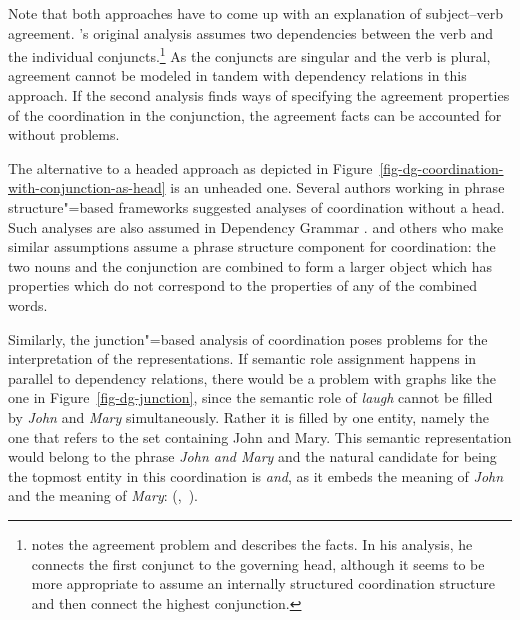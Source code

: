 Note that both approaches have to come up with an explanation of subject--verb agreement. \tes's
original analysis assumes two dependencies between the verb and the individual conjuncts.\footnote{%
  \citet[]{Eroms2000a} notes the agreement problem and describes the facts. In his
  analysis, he connects the first conjunct to the governing head, although it seems to be more
  appropriate to assume an internally structured coordination structure and then connect the highest conjunction.
} As the conjuncts are singular and the verb is plural, agreement cannot be modeled in tandem with dependency
relations in this approach. 
If the second analysis finds ways of specifying the agreement properties
of the coordination in the conjunction, the agreement facts can be accounted for without problems.

The alternative to a headed approach as depicted in Figure~\ref{fig-dg-coordination-with-conjunction-as-head} is an unheaded one. Several authors
working in phrase structure"=based frameworks suggested analyses of coordination without a
head. Such analyses are also assumed in Dependency Grammar
\citep{Hudson88a,Kahane97a}. \citet{Hudson88a} and others who make similar assumptions assume a phrase structure component for
coordination: 
the two nouns and the conjunction are combined to form a larger object which has properties which
do not correspond to the properties of any of the combined words.

\largerpage
Similarly, the junction"=based analysis of coordination poses problems for the interpretation of the
representations. If semantic role assignment happens in parallel to dependency relations, there would be a
problem with graphs like the one in Figure~\ref{fig-dg-junction}, since the semantic role of \emph{laugh} cannot be
filled by \emph{John} and \emph{Mary} simultaneously. Rather it is filled by one entity, namely the
one that refers to the set containing John and Mary. This semantic representation would belong to
the phrase \emph{John and Mary} and the natural candidate for being the topmost entity in this
coordination is \emph{and}, as it embeds the meaning of \emph{John} and the meaning of
\emph{Mary}: (,~).

